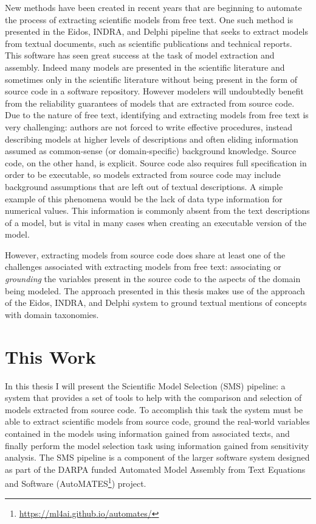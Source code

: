 New methods have been created in recent years that are beginning to automate the process of extracting scientific models from free text.
One such method is presented in the Eidos, INDRA, and Delphi \citep{EidosIndraDelphi} pipeline that seeks to extract models from textual documents, such as scientific publications and technical reports.
This software has seen great success at the task of model extraction and assembly.
Indeed many models are presented in the scientific literature and sometimes only in the scientific literature without being present in the form of source code in a software repository.
However modelers will undoubtedly benefit from the reliability guarantees of models that are extracted from source code.
Due to the nature of free text, identifying and extracting models from free text is very challenging: authors are not forced to write effective procedures, instead describing models at higher levels of descriptions and often eliding information assumed as common-sense (or domain-specific) background knowledge.
Source code, on the other hand, is explicit.
Source code also requires full specification in order to be executable, so models extracted from source code may include background assumptions that are left out of textual descriptions.
A simple example of this phenomena would be the lack of data type information for numerical values. This information is commonly absent from the text descriptions of a model, but is vital in many cases when creating an executable version of the model.

However, extracting models from source code does share at least one of the challenges associated with extracting models from free text:
associating or \emph{grounding} the variables present in the source code to the aspects of the domain being modeled.
The approach presented in this thesis makes use of the approach of the Eidos, INDRA, and Delphi system to ground textual mentions of concepts with domain taxonomies.

\section{This Work\label{sec:this_work}}
In this thesis I will present the Scientific Model Selection (SMS) pipeline: a system that provides a set of tools to help with the comparison and selection of models extracted from source code.
To accomplish this task the system must be able to extract scientific models from source code, ground the real-world variables contained in the models using information gained from associated texts, and finally perform the model selection task using information gained from sensitivity analysis.
The SMS pipeline is a component of the larger software system designed as part of the DARPA funded Automated Model Assembly from Text Equations and Software (AutoMATES\footnote{\url{https://ml4ai.github.io/automates/}}) project.

